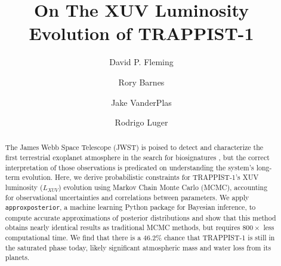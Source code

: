 \documentclass[twocolumn]{aastex62}
\newcommand{\approxposterior}[0]{\texttt{approxposterior}\xspace}
\begin{document}
\title{On The XUV Luminosity Evolution of TRAPPIST-1}



\author{David P. Fleming}

\author{Rory Barnes}

\author{Jake VanderPlas}

\author{Rodrigo Luger}


\begin{abstract}

The James Webb Space Telescope (JWST) is poised to detect and characterize the first terrestrial exoplanet atmosphere in the search for biosignatures \citep{Morley2017,Lustig2019}, but the correct interpretation of those observations is predicated on understanding the system's long-term evolution. Here, we derive probabilistic constraints for TRAPPIST-1's XUV luminosity ($L_{XUV}$) evolution using Markov Chain Monte Carlo (MCMC), accounting for observational uncertainties and correlations between parameters. We apply \approxposterior, a machine learning Python package for Bayesian inference, to compute accurate approximations of posterior distributions and show that this method obtains nearly identical results as traditional MCMC methods, but requires $800\times$ less computational time. We find that there is a $46.2\%$ chance that TRAPPIST-1 is still in the saturated phase today, likely significant atmospheric mass and water loss from its planets.

\end{abstract}

\end{document}
